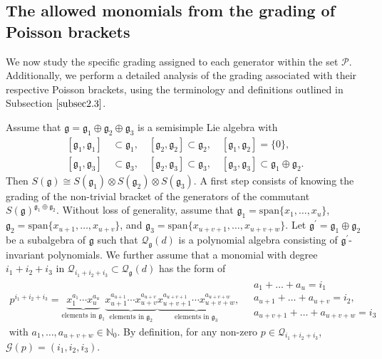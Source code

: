 \documentclass[10pt]{amsart}
\theoremstyle{definition}
\theoremstyle{corollary}
\theoremstyle{remark}
\theoremstyle{conclusion}
\begin{document}
\subsection{The allowed monomials from the grading of Poisson brackets}

\label{4.1}

 We now study the specific grading assigned to each generator within the set $\mathcal{P}$. Additionally, we perform a detailed analysis of the grading associated with their respective Poisson brackets, using the terminology and definitions outlined in Subsection $\ref{subsec2.3}$.

Assume that $\mathfrak{g} = \mathfrak{g}_1 \oplus \mathfrak{g}_2 \oplus \mathfrak{g}_3$ is a semisimple Lie algebra  with  \begin{align}
\nonumber
    [\mathfrak{g}_1,\mathfrak{g}_1] & \,\subset \mathfrak{g}_1, \quad  [\mathfrak{g}_2,\mathfrak{g}_2] \subset \mathfrak{g}_2, \quad  [\mathfrak{g}_1,\mathfrak{g}_2] = \{0\},  \\
    [\mathfrak{g}_1,\mathfrak{g}_3] & \,\subset \mathfrak{g}_3, \quad  [\mathfrak{g}_2,\mathfrak{g}_3] \subset \mathfrak{g}_3, \quad  [\mathfrak{g}_3,\mathfrak{g}_3] \subset \mathfrak{g}_1 \oplus \mathfrak{g}_2. \label{eq:c1}
\end{align} 
Then $S(\mathfrak{g}) \cong S(\mathfrak{g}_1) \otimes S(\mathfrak{g}_2) \otimes S(\mathfrak{g}_3)$.  A first step consists of knowing the grading of the non-trivial bracket of the generators of the commutant $S(\mathfrak{g})^{\mathfrak{g}_1 \oplus \mathfrak{g}_2}.$ Without loss of generality, assume that $\mathfrak{g}_1 = \mathrm{span} \{x_1,\ldots,x_u\}$, $\mathfrak{g}_2 = \mathrm{span} \{x_{u+1},\ldots,x_{u+v}\}$, and $ \mathfrak{g}_3  = \mathrm{span} \{x_{u+v+1},\ldots,x_{u+v+w}\} $. Let $\mathfrak{g}^\prime= \mathfrak{g}_1 \oplus \mathfrak{g}_2$ be a subalgebra of $\mathfrak{g}$ such that $\mathcal{Q}_\mathfrak{g}(d)$ is a polynomial algebra consisting of $\mathfrak{g}^\prime$-invariant polynomials. We further assume that a monomial with degree $i_1 + i_2  + i_3$ in $\mathcal{Q}_{i_1 + i_2  + i_3} \subset \mathcal{Q}_\mathfrak{g}(d)$ has the form of \begin{align*}
    p^{i_1 + i_2  + i_3}=   \underbrace{x_1^{a_1} \cdots x_u^{a_u}}_{\text{elements in $\mathfrak{g}_1$}} \underbrace{x_{u+1}^{a_{u+1}} \cdots x_{u+v}^{a_{u+v}}}_{\text{elements in $\mathfrak{g}_2$}}\underbrace{x_{u+v+1}^{a_{u+v+1}} \cdots x_{u+v+w}^{a_{u+v+w}}}_{\text{elements in $\mathfrak{g}_3$}} , \quad \begin{matrix}
           a_1 + \ldots + a_u = i_1 \\
           a_{u+1} + \ldots + a_{u+v} = i_2, \\
           a_{u+v+1} + \ldots + a_{u+v+w} = i_3
      \end{matrix} 
  \end{align*} $ \text{ with } a_1,\ldots,a_{u+v+w} \in \mathbb{N}_0 .$ By definition, for any non-zero $p \in \mathcal{Q}_{i_1 + i_2  + i_3}$,  $\mathcal{G}(p) = (i_1,i_2,i_3).$ 
\end{document}
